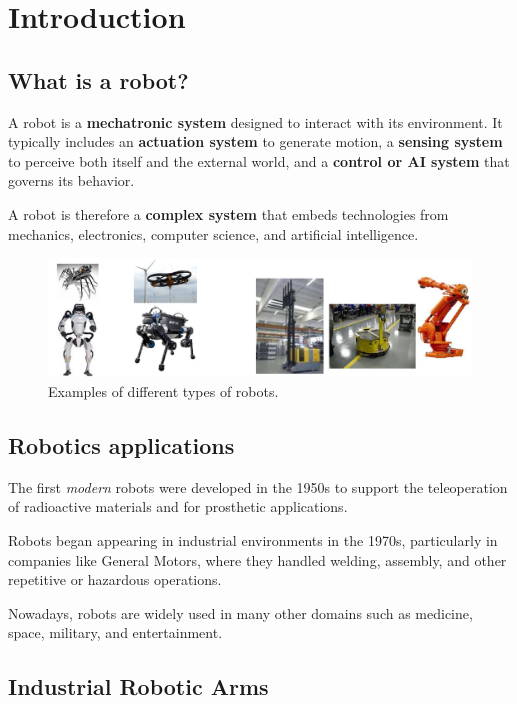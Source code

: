 \section{Introduction}

\subsection{What is a robot?}

A robot is a \textbf{mechatronic system} designed to interact with its environment. It typically includes an \textbf{actuation system} to generate motion, a \textbf{sensing system} to perceive both itself and the external world, and a \textbf{control or AI system} that governs its behavior.

A robot is therefore a \textbf{complex system} that embeds technologies from mechanics, electronics, computer science, and artificial intelligence.

\begin{figure}[H]
  \centering
  \includegraphics[width=\linewidth]{imgs/introduction_what_is_a_robot.png}
  \caption{Examples of different types of robots.}
\end{figure}

\hfill

\subsection{Robotics applications}

The first \textit{modern} robots were developed in the 1950s to support the teleoperation of radioactive materials and for prosthetic applications.

Robots began appearing in industrial environments in the 1970s, particularly in companies like General Motors, where they handled welding, assembly, and other repetitive or hazardous operations.

Nowadays, robots are widely used in many other domains such as medicine, space, military, and entertainment.

\hfill

\subsection{Industrial Robotic Arms}

